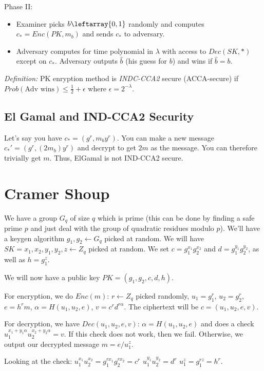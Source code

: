 \documentclass[psamsfonts]{amsart}
\begin{document}
Phase II:
\begin{itemize}
  \item Examiner picks $b \leftarray \{0,1\}$ randomly and computes $c_* = Enc(PK, m_b)$ and sends $c_*$ to adversary.
  \item Adversary computes for time polynomial in $\lambda$ with access to $Dec(SK,*)$ except on $c_*$. Adversary outputs $\hat{b}$ (his guess for $b$) and wins if $\hat{b} = b$.
\end{itemize}

\emph{Definition:} PK enryption method is \emph{INDC-CCA2} secure (ACCA-secure) if $Prob(\text{Adv wins}) \leq \frac{1}{2} + \epsilon$ where $\epsilon = 2^{-\lambda}$.

\subsection{El Gamal and IND-CCA2 Security}

Let's say you have $c_* = (g^r, m_b y^r)$. You can make a new message $c_*' = (g^r, (2 m_b) y^r)$ and decrypt to get $2m$ as the message. You can therefore trivially get $m$. Thus, ElGamal is not IND-CCA2 secure.

\section{Cramer Shoup}

We have a group $G_q$ of size $q$ which is prime (this can be done by finding a safe prime $p$ and just deal with the group of quadratic residues modulo $p$). We'll have a keygen algorithm $g_1, g_2 \leftarrow G_q$ picked at random. We will have $SK = x_1, x_2, y_1, y_2, z \leftarrow Z_q$ picked at random. We set $c = g_1^{x_1} g_2^{x_2}$ and $d = g_1^{y_1} g_2^{y_2}$, as well as $h = g_1^{z}$.

We will now have a public key $PK = (g_1, g_2, c, d, h)$.

For encryption, we do $Enc(m)$: $r \leftarrow Z_q$ picked randomly, $u_1 = g_1^r$, $u_2 = g_2^r$, $e = h^r m$, $\alpha = H(u_1, u_2, e)$, $v = c^r d^{r \alpha}$. The ciphertext will be $c = (u_1, u_2, e, v)$.

For decryption, we have $Dec(u_1, u_2, e, v)$: $\alpha = H(u_1, u_2, e)$ and does a check $u_1^{x_1 + y_1 \alpha} u_2^{x_2 + y_2 \alpha} = v$. If this check does not work, then we fail. Otherwise, we output our decrypted message $m = e/u_1^z$.

Looking at the check:
$u_1^{x_1} u_2^{x_2} = g_1^{r x_1} g_2^{r x_2} = c^r$
$u_1^{y_1} u_2^{y_2} = d^r$
$u_1^{z} = g_1^{r z} = h^r$.
\end{document}
